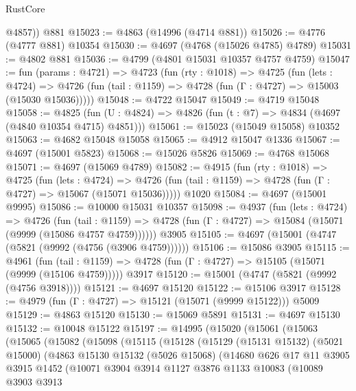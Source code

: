 \begin{lexlean}{RustCore}
\begin{coremodule}
        @4857))
    @881
@15023 := @4863 (@14996 (@4714 @881))
@15026 := @4776 (@4777 @881) @10354
@15030 := @4697 (@4768 (@15026 @4785) @4789)
@15031 := @4802 @881
@15036 := @4799 (@4801 @15031 @10357 @4757 @4759)
@15047 := fun (params : @4721) =>
  @4723
    (fun (rty : @1018) =>
    @4725
      (fun (lets : @4724) =>
      @4726 (fun (tail : @1159) => @4728 (fun (Γ : @4727) => @15003 (@15030 @15036)))))
@15048 := @4722 @15047
@15049 := @4719 @15048
@15058 := @4825
    (fun (U : @4824) => @4826 (fun (t : @7) => @4834 (@4697 (@4840 @10354 @4715) @4851)))
@15061 := @15023 (@15049 @15058) @10352
@15063 := @4682 @15048 @15058
@15065 := @4912 @15047 @1336
@15067 := @4697 (@15001 @5823)
@15068 := @15026 @5826
@15069 := @4768 @15068
@15071 := @4697 (@15069 @4789)
@15082 := @4915
    (fun (rty : @1018) =>
    @4725
      (fun (lets : @4724) =>
      @4726 (fun (tail : @1159) => @4728 (fun (Γ : @4727) => @15067 (@15071 @15036)))))
    @1020
@15084 := @4697 (@15001 @9995)
@15086 := @10000 @15031 @10357
@15098 := @4937
    (fun (lets : @4724) =>
    @4726
      (fun (tail : @1159) =>
      @4728 (fun (Γ : @4727) => @15084 (@15071 (@9999 (@15086 @4757 @4759))))))
    @3905
@15105 := @4697 (@15001 (@4747 (@5821 (@9992 (@4756 (@3906 @4759))))))
@15106 := @15086 @3905
@15115 := @4961
    (fun (tail : @1159) => @4728 (fun (Γ : @4727) => @15105 (@15071 (@9999 (@15106 @4759)))))
    @3917
@15120 := @15001 (@4747 (@5821 (@9992 (@4756 @3918))))
@15121 := @4697 @15120
@15122 := @15106 @3917
@15128 := @4979 (fun (Γ : @4727) => @15121 (@15071 (@9999 @15122))) @5009
@15129 := @4863 @15120
@15130 := @15069 @5891
@15131 := @4697 @15130
@15132 := @10048 @15122
@15197 := @14995
    (@15020
      (@15061
        (@15063
          (@15065
            (@15082
              (@15098
                (@15115
                  (@15128
                    (@15129
                      (@15131 @15132)
                      (@5021 @15000)
                      (@4863
                        @15130
                        @15132
                        (@5026 @15068)
                        (@14680
                          @626
                          @17
                          @11
                          @3905
                          @3915
                          @1452
                          (@10071
                            @3904
                            @3914
                            @1127
                            @3876
                            @1133
                            @10083
                            (@10089
                              @3903
                              @3913

\end{coremodule}
\end{lexlean}
